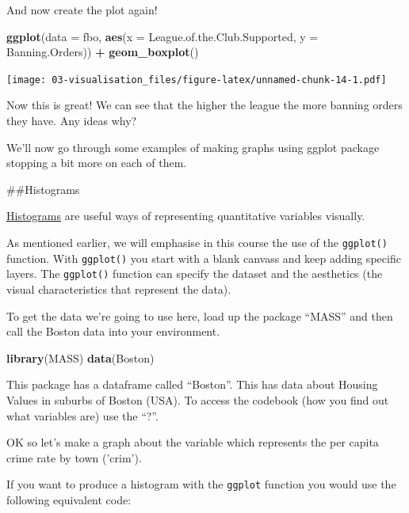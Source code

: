 \documentclass[]{book}
\newenvironment{Shaded}{\begin{snugshade}}{\end{snugshade}}
\newcommand{\DataTypeTok}[1]{\textcolor[rgb]{0.13,0.29,0.53}{#1}}
\newcommand{\KeywordTok}[1]{\textcolor[rgb]{0.13,0.29,0.53}{\textbf{#1}}}
\newcommand{\NormalTok}[1]{#1}
\newcommand{\OperatorTok}[1]{\textcolor[rgb]{0.81,0.36,0.00}{\textbf{#1}}}
\newcommand{\StringTok}[1]{\textcolor[rgb]{0.31,0.60,0.02}{#1}}
\theoremstyle{definition}
\theoremstyle{definition}
\theoremstyle{definition}
\theoremstyle{remark}
\begin{document}
And now create the plot again!

\begin{Shaded}
\begin{Highlighting}[]
\KeywordTok{ggplot}\NormalTok{(}\DataTypeTok{data =}\NormalTok{ fbo, }\KeywordTok{aes}\NormalTok{(}\DataTypeTok{x =}\NormalTok{ League.of.the.Club.Supported, }\DataTypeTok{y =}\NormalTok{ Banning.Orders)) }\OperatorTok{+}\StringTok{ }
\StringTok{  }\KeywordTok{geom_boxplot}\NormalTok{() }
\end{Highlighting}
\end{Shaded}

\texttt{[image: 03-visualisation\_files/figure-latex/unnamed-chunk-14-1.pdf]}

Now this is great! We can see that the higher the league the more
banning orders they have. Any ideas why?

We'll now go through some examples of making graphs using ggplot package
stopping a bit more on each of them.

\#\#Histograms

\href{http://www.learner.org/courses/againstallodds/unitpages/unit03.html}{Histograms}
are useful ways of representing quantitative variables visually.

As mentioned earlier, we will emphasise in this course the use of the
\texttt{ggplot()} function. With \texttt{ggplot()} you start with a
blank canvass and keep adding specific layers. The \texttt{ggplot()}
function can specify the dataset and the aesthetics (the visual
characteristics that represent the data).

To get the data we're going to use here, load up the package ``MASS''
and then call the Boston data into your environment.

\begin{Shaded}
\begin{Highlighting}[]
\KeywordTok{library}\NormalTok{(MASS)}
\KeywordTok{data}\NormalTok{(Boston)}
\end{Highlighting}
\end{Shaded}

This package has a dataframe called ``Boston''. This has data about
Housing Values in suburbs of Boston (USA). To access the codebook (how
you find out what variables are) use the ``?''.

OK so let's make a graph about the variable which represents the per
capita crime rate by town ('crim').

If you want to produce a histogram with the \texttt{ggplot} function you
would use the following equivalent code:
\end{document}

